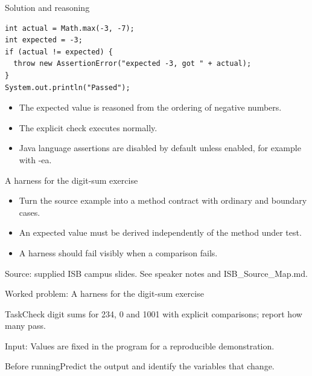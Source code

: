 \documentclass[10pt,aspectratio=169]{beamer}
\begin{document}
\begin{frame}[fragile,t]{Solution and reasoning}
\begin{lstlisting}
int actual = Math.max(-3, -7);
int expected = -3;
if (actual != expected) {
  throw new AssertionError("expected -3, got " + actual);
}
System.out.println("Passed");
\end{lstlisting}\vspace{1mm}\small\begin{itemize}
\item The expected value is reasoned from the ordering of negative numbers.
\item The explicit check executes normally.
\item Java language assertions are disabled by default unless enabled, for example with -ea.
\end{itemize}
\end{frame}

\begin{frame}[fragile,t]{A harness for the digit{-}sum exercise}
\begin{itemize}
\item Turn the source example into a method contract with ordinary and boundary cases.
\item An expected value must be derived independently of the method under test.
\item A harness should fail visibly when a comparison fails.
\end{itemize}
\vspace{3mm}\footnotesize\textcolor{accent}{Source: supplied ISB campus slides. See speaker notes and ISB\_Source\_Map.md.}
\end{frame}

\begin{frame}[fragile,t]{Worked problem: A harness for the digit{-}sum exercise}
\begin{block}{Task}Check digit sums for 234, 0 and 1001 with explicit comparisons; report how many pass.\end{block}
\small Input: Values are fixed in the program for a reproducible demonstration.\par\vspace{3mm}\begin{exampleblock}{Before running}Predict the output and identify the variables that change.\end{exampleblock}
\end{frame}
\end{document}
